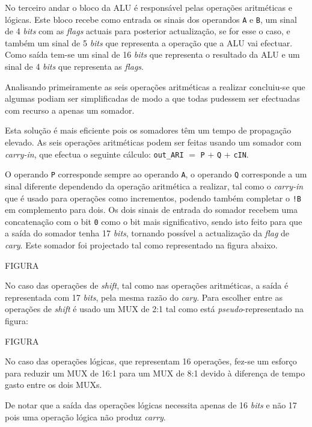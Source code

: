 \documentclass[11pt]{article}
\numberwithin{equation}{section}
\begin{document}
No terceiro andar o bloco da ALU é responsável pelas operações aritméticas e lógicas. Este bloco recebe como entrada os sinais dos operandos \texttt{A} e \texttt{B}, um sinal de 4 \textit{bits} com as \textit{flags} actuais para posterior actualização, se for esse o caso, e também um sinal de 5 \textit{bits} que representa a operação que a ALU vai efectuar. Como saída tem-se um sinal de 16 \textit{bits} que representa o resultado da ALU e um sinal de 4 \textit{bits} que representa as \textit{flags}.

Analisando primeiramente as seis operações aritméticas a realizar concluiu-se que algumas podiam ser simplificadas de modo a que todas pudessem ser efectuadas com recurso a apenas um somador. 


Esta solução é mais eficiente pois os somadores têm um tempo de propagação elevado. As seis operações aritméticas podem ser feitas usando um somador com \textit{carry-in}, que efectua o seguinte cálculo: \texttt{out\_ARI} $=$ \texttt{P} + \texttt{Q} + \texttt{cIN}. 

O operando \texttt{P} corresponde sempre ao operando \texttt{A}, o operando \texttt{Q} corresponde a  um sinal diferente dependendo da operação aritmética a realizar, tal como o \textit{carry-in} que é usado para operações como incrementos, podendo também completar o \texttt{!B} em complemento para dois. Os dois sinais de entrada do somador recebem uma concatenação com o bit \texttt{0} como o bit mais significativo, sendo isto feito para que a saída do somador tenha 17 \textit{bits}, tornando possível a actualização da \textit{flag} de \textit{cary}. Este somador foi projectado tal como representado na figura abaixo.

FIGURA

No caso das operações de \textit{shift}, tal como nas operações aritméticas, a saída é representada com 17 \textit{bits}, pela mesma razão do \textit{cary}. Para escolher entre as operações de \textit{shift} é usado um MUX de 2:1 tal como está \textit{pseudo}-representado na figura:

FIGURA

No caso das operações lógicas, que representam 16 operações, fez-se um esforço para reduzir um MUX de 16:1 para um MUX de 8:1 devido à diferença de tempo gasto entre os dois MUXs.

De notar que a saída das operações lógicas necessita apenas de 16 \textit{bits} e não 17 pois uma operação lógica não produz \textit{carry}.
\end{document}
